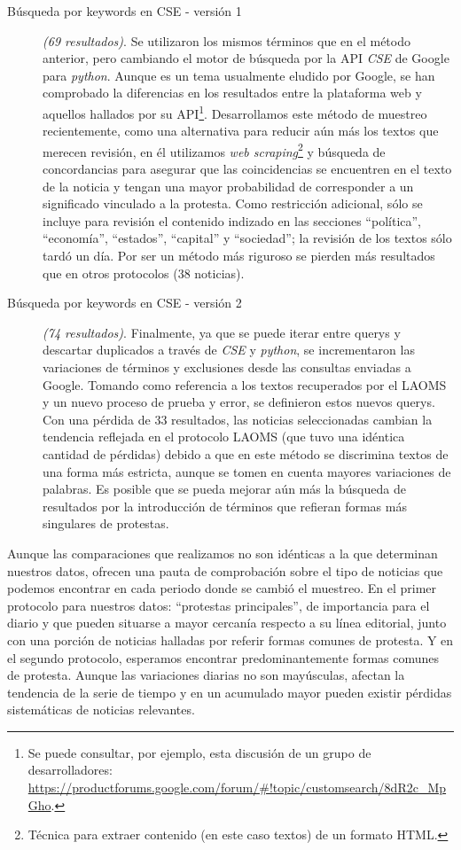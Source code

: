 \documentclass[letterpaper, 11pt]{book}
\theoremstyle{definition}
\theoremstyle{remark}
\begin{document}
\begin{description}
    \item[Búsqueda por keywords en CSE - versión 1]  \emph{(69 resultados)}. Se utilizaron los mismos términos que en el método anterior, pero cambiando el motor de búsqueda por la API \emph{CSE} de Google para \emph{python}. 
    Aunque es un tema usualmente eludido por Google, se han comprobado la diferencias en los resultados entre la plataforma web y aquellos hallados por su API\footnote{
	Se puede consultar, por ejemplo, esta discusión de un grupo de desarrolladores: \url{https://productforums.google.com/forum/\#!topic/customsearch/8dR2c_MpGho}.
    }. 
    Desarrollamos este método de muestreo recientemente, como una alternativa para reducir aún más los textos que merecen revisión, en él utilizamos \emph{web scraping}\footnote{
	Técnica para extraer contenido (en este caso textos) de un formato HTML.
    } y búsqueda de concordancias para asegurar que las coincidencias se encuentren en el texto de la noticia y tengan una mayor probabilidad de corresponder a un significado vinculado a la protesta. 
    Como restricción adicional, sólo se incluye para revisión el contenido indizado en las secciones ``política'', ``economía'', ``estados'', ``capital'' y ``sociedad''; la revisión de los textos sólo tardó un día. 
    Por ser un método más riguroso se pierden más resultados que en otros protocolos (38 noticias).
    
    
    \item[Búsqueda por keywords en CSE - versión 2]  \emph{(74 resultados)}. 
    Finalmente, ya que se puede iterar entre querys y descartar duplicados a través de \emph{CSE} y \emph{python}, se incrementaron las variaciones de términos y exclusiones desde las consultas enviadas a Google. 
    Tomando como referencia a los textos recuperados por el LAOMS y un nuevo proceso de prueba y error, se definieron estos nuevos querys. Con una pérdida de 33 resultados, las noticias seleccionadas cambian la tendencia reflejada en el protocolo LAOMS (que tuvo una idéntica cantidad de pérdidas) debido a que en este método se discrimina textos de una forma más estricta, aunque se tomen en cuenta mayores variaciones de palabras. 
    Es posible que se pueda mejorar aún más la búsqueda de resultados por la introducción de términos que refieran formas más singulares de protestas.
\end{description}

Aunque las comparaciones que realizamos no son idénticas a la que determinan nuestros datos, ofrecen una pauta de comprobación sobre el tipo de noticias que podemos encontrar en cada periodo donde se cambió el muestreo. 
En el primer protocolo para nuestros datos: ``protestas principales'', de importancia para el diario y que pueden situarse a mayor cercanía respecto a su línea editorial, junto con una porción de noticias halladas por referir formas comunes de protesta. 
Y en el segundo protocolo, esperamos encontrar predominantemente formas comunes de protesta. 
Aunque las variaciones diarias no son mayúsculas, afectan la tendencia de la serie de tiempo y en un acumulado mayor pueden existir pérdidas sistemáticas de noticias relevantes. 
\end{document}
